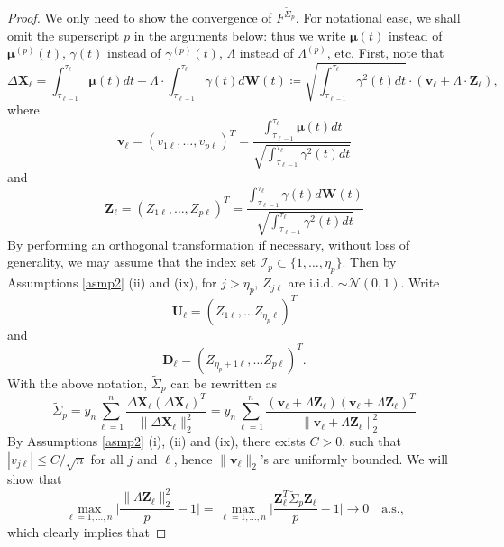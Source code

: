 \documentclass[a4paper,11pt]{book}
\theoremstyle{plain}
\theoremstyle{definition}
\begin{document}
    \begin{proof}
    	We only need to show the convergence of $F^{\widetilde{\Sigma}_p}$. For notational ease, we shall omit the superscript $p$ in the arguments below: thus we write $\boldsymbol{\mu}(t)$ instead of $\boldsymbol{\mu}^{(p)}(t)$, $\gamma(t)$ instead of $\gamma^{(p)}(t)$, $\Lambda$ instead of $\Lambda^{(p)}$, etc. First, note that
    	\[ \Delta \mathbf{X}_\ell = \int_{\tau_{\ell-1}}^{\tau_\ell} \boldsymbol{\mu}(t) dt + \Lambda \cdot \int_{\tau_{\ell-1}}^{\tau_\ell} \gamma(t) d\mathbf{W}(t) \coloneqq \sqrt{\int_{\tau_{\ell-1}}^{\tau_\ell} \gamma^2(t) dt}\cdot (\mathbf{v}_\ell + \Lambda \cdot \mathbf{Z}_\ell), \]
    	where
    	\[ \mathbf{v}_\ell = (v_{1\ell}, \dots, v_{p\ell})^T = \frac{\int_{\tau_{\ell-1}}^{\tau_\ell} \boldsymbol{\mu}(t) dt}{\sqrt{\int_{\tau_{\ell-1}}^{\tau_\ell} \gamma^2(t) dt}} \]
    	and
    	\[ \mathbf{Z}_\ell = (Z_{1\ell}, \dots, Z_{p\ell})^T = \frac{\int_{\tau_{\ell-1}}^{\tau_\ell} \gamma(t) d\mathbf{W}(t)}{\sqrt{\int_{\tau_{\ell-1}}^{\tau_\ell} \gamma^2(t) dt}} \]
    	By performing an orthogonal transformation if necessary, without loss of generality, we may assume that the index set $\mathcal{I}_p \subset \{ 1, \dots, \eta_p \} $. Then by Assumptions \ref{asmp2} (ii) and (ix), for $j > \eta_p$, $Z_{j\ell}$ are i.i.d. $\sim \mathcal{N}(0, 1)$. Write
    	\[ \mathbf{U}_\ell = (Z_{1\ell}, \dots Z_{\eta_p\ell})^T \]
    	and 
    	\[ \mathbf{D}_\ell = (Z_{\eta_{p}+1\ell}, \dots Z_{p\ell})^T.\]
    	With the above notation, $\widetilde{\Sigma}_p$ can be rewritten as
    	\begin{equation}
    	\widetilde{\Sigma}_p = y_n \sum_{\ell=1}^{n} \frac{\Delta \mathbf{X}_\ell (\Delta \mathbf{X}_\ell)^T}{\|\Delta \mathbf{X}_\ell\|_2^2} = y_n \sum_{\ell=1}^{n} \frac{(\mathbf{v}_\ell + \Lambda \mathbf{Z}_\ell) (\mathbf{v}_\ell + \Lambda \mathbf{Z}_\ell)^T}{\|\mathbf{v}_\ell + \Lambda \mathbf{Z}_\ell\|_2^2}
    	\end{equation}
    	By Assumptions \ref{asmp2} (i), (ii) and (ix), there exists $C > 0$, such that $|v_{j\ell}| \leq C / \sqrt{n}$ for all $j$ and $\ell$, hence $\| \mathbf{v}_\ell\|_2$'s are uniformly bounded. We will show that
    	\begin{equation} \label{334}
    		\max_{\ell = 1, \dots, n} \Bigg|\frac{  \| \Lambda \mathbf{Z}_\ell \|_2^2}{p} - 1\Bigg| = \max_{\ell = 1, \dots, n} \Bigg| \frac{  \mathbf{Z}_\ell^T \breve{\Sigma}_p \mathbf{Z}_\ell}{p} - 1\Bigg| \rightarrow 0 \quad \text{a.s.},
    	\end{equation}
    	which clearly implies that

\end{proof}
\end{document}
